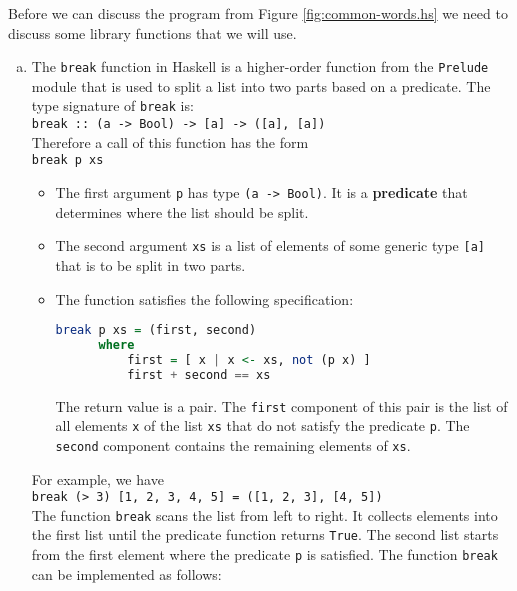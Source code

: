 \noindent
Before we can discuss the program from Figure \ref{fig:common-words.hs} we need to discuss some library
functions that we will use.
\begin{enumerate}[(a)]  
\item The \texttt{break} function in Haskell is a higher-order function from the \texttt{Prelude} module that
      is used to split a list into two parts based on a predicate. 
      The type signature of \texttt{break} is:
      \\[0.2cm]
      \hspace*{1.3cm}
      \texttt{break :: (a -> Bool) -> [a] -> ([a], [a])}
      \\[0.2cm]
      Therefore a call of this function has the form
      \\[0.2cm]
      \hspace*{1.3cm}
      \texttt{break p xs}
      \begin{itemize}
      \item The first argument \texttt{p} has type \texttt{(a -> Bool)}.  It is a \textbf{predicate} that
            determines where the list should be split. 
      \item The second argument \texttt{xs} is a list of elements of some generic type \texttt{[a]} that is to
            be split in two parts.
      \item The function satisfies the following specification:
            \begin{lstlisting}[style=haskellstyle, language=Haskell]
  break p xs = (first, second)
      where
          first = [ x | x <- xs, not (p x) ]
          first + second == xs
            \end{lstlisting}
            The return value is a pair.  The \texttt{first} component of this pair is the list of all elements
            \texttt{x} of the list \texttt{xs} that do not satisfy the predicate \texttt{p}.  The
            \texttt{second} component contains the remaining elements of \texttt{xs}.
    \end{itemize}
    For example, we have
    \\[0.2cm]
    \hspace*{1.3cm}
    \texttt{break (> 3) [1, 2, 3, 4, 5] = ([1, 2, 3], [4, 5])}
    \\[0.2cm]
    The function \texttt{break} scans the list from left to right.  It collects elements into the first list
    until the predicate function returns \texttt{True}.  The second list starts from the first element where
    the predicate \texttt{p} is satisfied.  The function \texttt{break} can be implemented as follows:

\end{enumerate}
